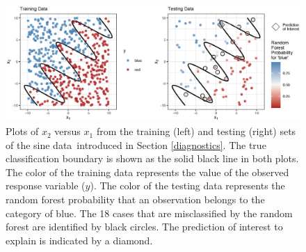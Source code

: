 \documentclass[AMS,STIX2COL]{WileyNJD-v2}\usepackage[]{graphicx}\usepackage[]{color}
\newenvironment{knitrout}{}{} %
\newcommand{\data}{sine data}
\begin{document}
\begin{figure}[!thp]
\centering
\begin{knitrout}
\color{fgcolor}

{\centering \includegraphics[width=6.5in]{figure-03-1} 

}



\end{knitrout}
\caption{Plots of $x_2$ versus $x_1$ from the training (left) and testing (right) sets of the \data \ introduced in Section \ref{diagnostics}. The true classification boundary is shown as the solid black line in both plots. The color of the training data  represents the value of the observed response variable ($y$). The color of the testing data  represents the random forest probability that an observation belongs to the category of blue. The 18 cases that are misclassified by the random forest are identified by black circles. The prediction of interest to explain is indicated by a diamond.}
\label{fig:figure-03}
\end{figure}
\end{document}

